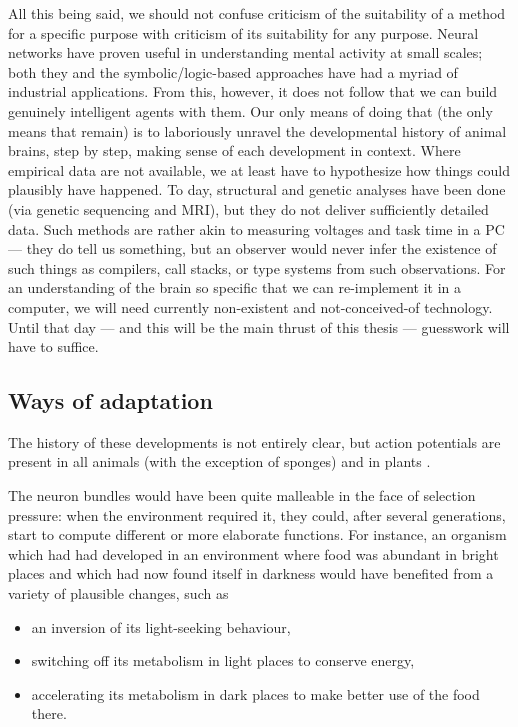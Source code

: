 All this being said, we should not confuse criticism of the suitability of a method for a specific purpose with criticism of its suitability for any purpose. Neural networks have proven useful in understanding mental activity at small scales; both they and the symbolic/logic-based approaches have had a myriad of industrial applications. From this, however, it does not follow that we can build genuinely intelligent agents with them. Our only means of doing that (the only means that remain) is to laboriously unravel the developmental history of animal brains, step by step, making sense of each development in context. Where empirical data are not available, we at least have to hypothesize how things could plausibly have happened. To day, structural and genetic analyses have been done (via genetic sequencing and MRI), but they do not deliver sufficiently detailed data. Such methods are rather akin to measuring voltages and task time in a PC --- they do tell us something, but an observer would never infer the existence of such things as compilers, call stacks, or type systems from such observations. For an understanding of the brain so specific that we can re-implement it in a computer, we will need currently non-existent and not-conceived-of technology. Until that day --- and this will be the main thrust of this thesis --- guesswork will have to suffice.

\subsection{Ways of adaptation}


The history of these developments is not entirely clear, but action potentials are present in all animals (with the exception of sponges) and in plants \cite{Leys01051999, PCE:PCE1614}. 

The neuron bundles would have been quite malleable in the face of selection pressure: when the environment required it, they could, after several generations, start to compute different or more elaborate functions. For instance, an organism which had had developed in an environment where food was abundant in bright places and which had now found itself in darkness would have benefited from a variety of plausible changes, such as
\begin{itemize}
	\item an inversion of its light-seeking behaviour,
	\item switching off its metabolism in light places to conserve energy,
	\item accelerating its metabolism in dark places to make better use of the food there.
\end{itemize}

